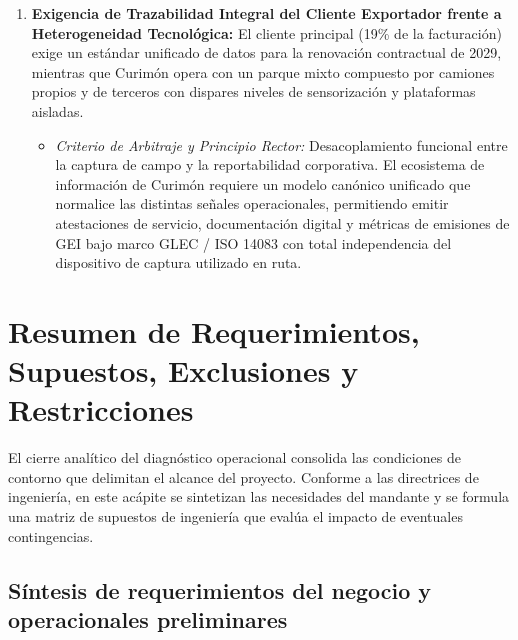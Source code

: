 \begin{enumerate}
\begin{itemize}
  \end{itemize}
  \item \textbf{Exigencia de Trazabilidad Integral del Cliente Exportador frente a Heterogeneidad Tecnológica:} El cliente principal (19\% de la facturación) exige un estándar unificado de datos para la renovación contractual de 2029, mientras que Curimón opera con un parque mixto compuesto por camiones propios y de terceros con dispares niveles de sensorización y plataformas aisladas.
  \begin{itemize}
    \item \textit{Criterio de Arbitraje y Principio Rector:} Desacoplamiento funcional entre la captura de campo y la reportabilidad corporativa. El ecosistema de información de Curimón requiere un modelo canónico unificado que normalice las distintas señales operacionales, permitiendo emitir atestaciones de servicio, documentación digital y métricas de emisiones de GEI bajo marco GLEC / ISO 14083 con total independencia del dispositivo de captura utilizado en ruta.
  \end{itemize}
\end{enumerate}

\section{Resumen de Requerimientos, Supuestos, Exclusiones y Restricciones}\label{sec:2-requerimientos}

El cierre analítico del diagnóstico operacional consolida las condiciones de contorno que delimitan el alcance del proyecto. Conforme a las directrices de ingeniería, en este acápite se sintetizan las necesidades del mandante y se formula una matriz de supuestos de ingeniería que evalúa el impacto de eventuales contingencias.

\subsection{Síntesis de requerimientos del negocio y operacionales preliminares}\label{sec:2-req-sintesis}

